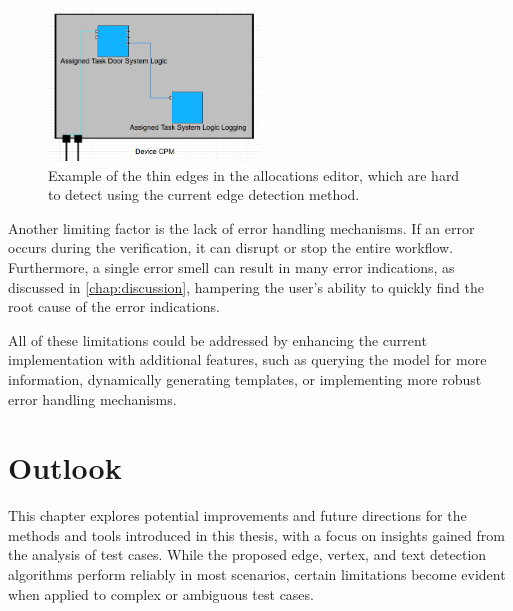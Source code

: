 \begin{figure}[H]
    \centering
    \includegraphics[width=0.5\textwidth]{pictures/allocations_thin_edges.png}
    \caption[Example of the thin edges in the allocations editor]{Example of the thin edges in the allocations editor, which are hard to detect using the current edge detection method.}
    \label{fig:allocations_thin_edges}
\end{figure}
Another limiting factor is the lack of error handling mechanisms. If an error occurs during the verification, it can disrupt or stop the entire workflow. Furthermore, a single error smell can result in many error indications, as discussed in \autoref{chap:discussion}, hampering the user's ability to quickly find the root cause of the error indications.

All of these limitations could be addressed by enhancing the current implementation with additional features, such as querying the model for more information, dynamically generating templates, or implementing more robust error handling mechanisms.\\


\chapter{Outlook}
\label{chap:outlook}
This chapter explores potential improvements and future directions for the methods and tools introduced in this thesis, with a focus on insights gained from the analysis of test cases. While the proposed edge, vertex, and text detection algorithms perform reliably in most scenarios, certain limitations become evident when applied to complex or ambiguous test cases.

